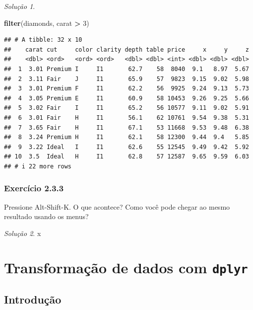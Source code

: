 \documentclass[
]{latex/krantz}
\newenvironment{Shaded}{\begin{snugshade}}{\end{snugshade}}
\newcommand{\DecValTok}[1]{\textcolor[rgb]{0.00,0.00,0.81}{#1}}
\newcommand{\FunctionTok}[1]{\textcolor[rgb]{0.13,0.29,0.53}{\textbf{#1}}}
\newcommand{\NormalTok}[1]{#1}
\newcommand{\SpecialCharTok}[1]{\textcolor[rgb]{0.81,0.36,0.00}{\textbf{#1}}}
\theoremstyle{definition}
\theoremstyle{definition}
\theoremstyle{definition}
\theoremstyle{definition}
\theoremstyle{remark}
\newtheorem*{solution}{Solução}
\begin{document}
\begin{solution}
\begin{Shaded}
\begin{Highlighting}[]
\FunctionTok{filter}\NormalTok{(diamonds, carat }\SpecialCharTok{\textgreater{}} \DecValTok{3}\NormalTok{)}
\end{Highlighting}
\end{Shaded}

\begin{verbatim}
## # A tibble: 32 x 10
##    carat cut     color clarity depth table price     x     y     z
##    <dbl> <ord>   <ord> <ord>   <dbl> <dbl> <int> <dbl> <dbl> <dbl>
##  1  3.01 Premium I     I1       62.7    58  8040  9.1   8.97  5.67
##  2  3.11 Fair    J     I1       65.9    57  9823  9.15  9.02  5.98
##  3  3.01 Premium F     I1       62.2    56  9925  9.24  9.13  5.73
##  4  3.05 Premium E     I1       60.9    58 10453  9.26  9.25  5.66
##  5  3.02 Fair    I     I1       65.2    56 10577  9.11  9.02  5.91
##  6  3.01 Fair    H     I1       56.1    62 10761  9.54  9.38  5.31
##  7  3.65 Fair    H     I1       67.1    53 11668  9.53  9.48  6.38
##  8  3.24 Premium H     I1       62.1    58 12300  9.44  9.4   5.85
##  9  3.22 Ideal   I     I1       62.6    55 12545  9.49  9.42  5.92
## 10  3.5  Ideal   H     I1       62.8    57 12587  9.65  9.59  6.03
## # i 22 more rows
\end{verbatim}

\end{solution}

\hypertarget{exr2-3-3}{%
\subsection*{Exercício 2.3.3}\label{exr2-3-3}}

Pressione Alt-Shift-K. O que acontece? Como você pode chegar ao mesmo resultado usando os menus?

\begin{solution}
x
\end{solution}

\hypertarget{transformauxe7uxe3o-de-dados-com-dplyr}{%
\chapter{\texorpdfstring{Transformação de dados com \texttt{dplyr}}{Transformação de dados com dplyr}}\label{transformauxe7uxe3o-de-dados-com-dplyr}}

\hypertarget{introduuxe7uxe3o-1}{%
\section{Introdução}\label{introduuxe7uxe3o-1}}
\end{document}
